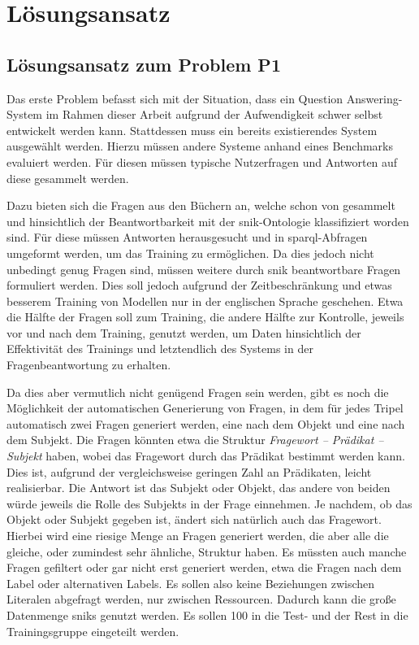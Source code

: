 \chapter{Lösungsansatz}\label{ch:approach}

\section{Lösungsansatz zum Problem P1}

Das erste Problem befasst sich mit der Situation, dass ein Question Answering-System im Rahmen dieser Arbeit aufgrund der Aufwendigkeit schwer selbst entwickelt werden kann.
Stattdessen muss ein bereits existierendes System ausgewählt werden.
Hierzu müssen andere Systeme anhand eines Benchmarks evaluiert werden.
Für diesen müssen typische Nutzerfragen und Antworten auf diese gesammelt werden.

Dazu bieten sich die Fragen aus den Büchern an, welche schon von \citet{arneba} gesammelt und hinsichtlich der Beantwortbarkeit mit der \ac{snik}-Ontologie klassifiziert worden sind.
Für diese müssen Antworten herausgesucht und in \ac{sparql}-Abfragen umgeformt werden, um das Training zu ermöglichen.
Da dies jedoch nicht unbedingt genug Fragen sind, müssen weitere durch \ac{snik} beantwortbare Fragen formuliert werden.
Dies soll jedoch aufgrund der Zeitbeschränkung und etwas besserem Training von Modellen nur in der englischen Sprache geschehen.
Etwa die Hälfte der Fragen soll zum Training, die andere Hälfte zur Kontrolle, jeweils vor und nach dem Training, genutzt werden,
um Daten hinsichtlich der Effektivität des Trainings und letztendlich des Systems in der Fragenbeantwortung zu erhalten.

Da dies aber vermutlich nicht genügend Fragen sein werden, gibt es noch die Möglichkeit der automatischen Generierung von Fragen, in dem für jedes Tripel automatisch zwei Fragen generiert werden,
eine nach dem Objekt und eine nach dem Subjekt.
Die Fragen könnten etwa die Struktur \emph{Fragewort -- Prädikat -- Subjekt} haben, wobei das Fragewort durch das Prädikat bestimmt werden kann.
Dies ist, aufgrund der vergleichsweise geringen Zahl an Prädikaten, leicht realisierbar.
Die Antwort ist das Subjekt oder Objekt, das andere von beiden würde jeweils die Rolle des Subjekts in der Frage einnehmen.
Je nachdem, ob das Objekt oder Subjekt gegeben ist, ändert sich natürlich auch das Fragewort.
Hierbei wird eine riesige Menge an Fragen generiert werden, die aber alle die gleiche, oder zumindest sehr ähnliche, Struktur haben.
Es müssten auch manche Fragen gefiltert oder gar nicht erst generiert werden, etwa die Fragen nach dem Label oder alternativen Labels.
Es sollen also keine Beziehungen zwischen Literalen abgefragt werden, nur zwischen Ressourcen.
Dadurch kann die große Datenmenge \ac{snik}s genutzt werden.
Es sollen 100 in die Test- und der Rest in die Trainingsgruppe eingeteilt werden.

